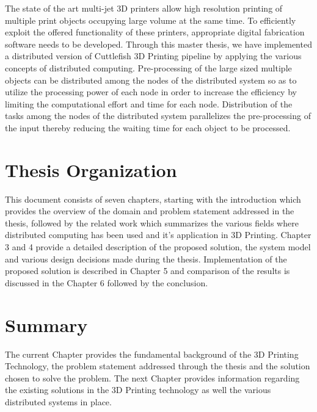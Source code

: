 The state of the art multi-jet 3D printers allow high resolution printing of multiple print objects occupying large volume at the same time. To efficiently exploit the offered functionality of these printers, appropriate digital fabrication software needs to be developed. Through this master thesis, we have implemented a distributed version of Cuttlefish 3D Printing pipeline by applying the various concepts of distributed computing. Pre-processing of the large sized multiple objects can be distributed among the nodes of the distributed system so as to utilize the processing power of each node in order to increase the efficiency by limiting the computational effort and time for each node. Distribution of the tasks among the nodes of the distributed system parallelizes the pre-processing of the input thereby reducing the waiting time for each object to be processed. 

\section{Thesis Organization}

This document consists of seven chapters, starting with the introduction which provides the overview of the domain and problem statement addressed in the thesis, followed by the related work which summarizes the various fields where distributed computing has been used and it's application in 3D Printing. Chapter 3 and 4 provide a detailed description of the proposed solution, the system model and various design decisions made during the thesis. Implementation of the proposed solution is described in Chapter 5 and comparison of the results is discussed in the Chapter 6 followed by the conclusion. 

\section{Summary}

The current Chapter provides the fundamental background of the 3D Printing Technology, the problem statement addressed through the thesis and the solution chosen to solve the problem. The next Chapter provides information regarding the existing solutions in the 3D Printing technology as well the various distributed systems in place. 

